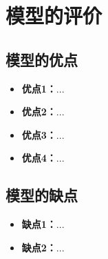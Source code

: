 
\section{模型的评价}


\subsection{模型的优点}
\begin{itemize}[itemindent=2em]
\item \textbf{优点1：}...
\item \textbf{优点2：}...
\item \textbf{优点3：}...
\item \textbf{优点4：}...
\end{itemize}

\subsection{模型的缺点}
\begin{itemize}[itemindent=2em]
\item \textbf{缺点1：}...
\item \textbf{缺点2：}...
\end{itemize}
